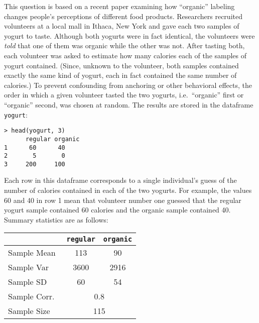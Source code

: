 \documentclass[addpoints,12pt]{exam}
\begin{document}
\begin{questions}
\question This question is based on a recent paper examining how ``organic'' labeling changes people's perceptions of different food products. Researchers recruited volunteers at a local mall in Ithaca, New York and gave each two samples of yogurt to taste. Although both yogurts were in fact identical, the volunteers were \emph{told} that one of them was organic while the other was not. After tasting both, each volunteer was asked to estimate how many calories each of the samples of yogurt contained. (Since, unknown to the volunteer, both samples contained exactly the same kind of yogurt, each in fact contained the same number of calories.) To prevent confounding from anchoring or other behavioral effects, the order in which a given volunteer tasted the two yogurts, i.e.\ ``organic'' first or ``organic'' second, was chosen at random. The results are stored in the dataframe \texttt{yogurt}: 
	\begin{verbatim}
> head(yogurt, 3)
	  regular organic
1      60      40
2       5       0
3     200     100
	\end{verbatim}
Each row in this dataframe corresponds to a single individual's guess of the number of calories contained in each of the two yogurts. For example, the values 60 and 40 in row 1 mean that volunteer number one guessed that the regular yogurt sample contained 60 calories and the organic sample contained 40. Summary statistics are as follows:
	\begin{center}
		\begin{tabular}{|lcc|}
		\hline
			& \texttt{regular} & \texttt{organic}\\
			\hline
		Sample Mean & 113 & 90\\
		Sample Var & 3600 & 2916\\
		Sample SD & 60 & 54\\ 
		Sample Corr.\ &\multicolumn{2}{c|}{0.8} \\
		Sample Size &\multicolumn{2}{c|}{115} \\
		\hline
		\end{tabular}
	\end{center}
	\begin{parts}

\end{parts}
\end{questions}
\end{document}
